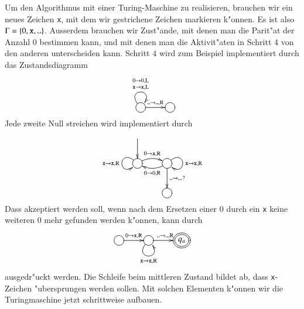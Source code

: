 Um den Algorithmus mit einer Turing-Maschine zu realisieren, brauchen wir
ein neues Zeichen {\tt x}, mit dem wir gestrichene Zeichen markieren
k"onnen. Es ist also $\Gamma = \{0,{\tt x},\blank\}$.
Ausserdem brauchen wir
Zust"ande, mit denen man die Parit"at der Anzahl $0$ bestimmen kann, und
mit denen man die Aktivit"aten in Schritt 4 von den anderen unterscheiden
kann. Schritt $4$ wird zum Beispiel implementiert durch das
Zustandsdiagramm
\[
\entrymodifiers={++[o][F]}
\xymatrix{
{}\ar@(ul,ur)^{\genfrac{}{}{0pt}{1}{0\to 0,\text{L}}{{\tt x}\to{\tt x},\text{L}}}
\ar[r]^{\blank\to\blank,\text{R}}
	&
}
\]
Jede zweite Null streichen wird implementiert durch
\[
\entrymodifiers={++[o][F]}
\xymatrix{
*+\txt{}\ar[d]
\\
\ar@/^/[r]^{0\to{\tt x},\text{R}}
\ar@(ul,dl)_{\tt x\to\tt x,\text{R}}
	&\ar@/^/[l]^{0\to 0,\text{R}}
         \ar@(ur,dr)^{\tt x\to\tt x,\text{R}}
	 \ar[d]^{\blank\to\blank,?}
\\
*+\txt{}
	&{}
}
\]
Dass akzeptiert werden soll, wenn nach dem Ersetzen einer $0$ durch
ein {\tt x} keine weiteren $0$ mehr gefunden werden k"onnen, kann durch
\[
\entrymodifiers={++[o][F]}
\xymatrix{
\ar[r]^{0\to{\tt x},\text{R}}
	&{} \ar@(dl,dr)_{{\tt x}\to{\tt x},\text{R}}
	    \ar[r]^{\blank\to\blank,\text{R}}
		&*++[o][F=]{q_a}
}
\]
ausgedr"uckt werden. Die Schleife beim mittleren Zustand
bildet ab, dass {\tt x}-Zeichen "ubersprungen werden sollen.
Mit solchen Elementen k"onnen wir die Turingmaschine jetzt schrittweise
aufbauen.

